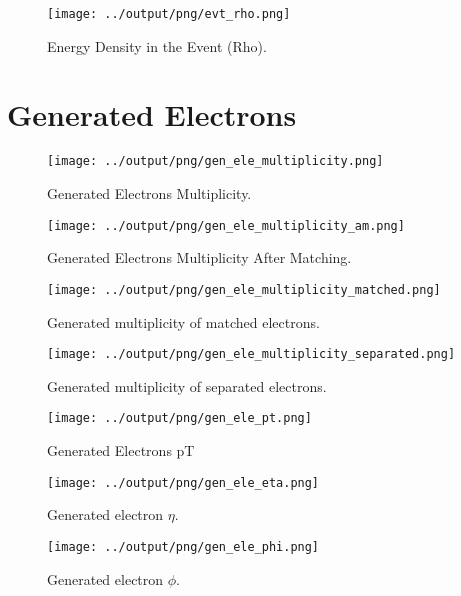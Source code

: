 \documentclass[11pt]{book}
\begin{document}
\begin{figure}[htb]
\centering
\texttt{[image: ../output/png/evt\_rho.png]}
\caption{Energy Density in the Event (Rho).}
\label{fig:rho}
\end{figure}
\clearpage


\section{Generated Electrons}

\begin{figure}[htb]
\centering
\texttt{[image: ../output/png/gen\_ele\_multiplicity.png]}
\caption{Generated Electrons Multiplicity.}
\label{fig:gen_ele_multiplicity}
\end{figure}

\begin{figure}[htb]
\centering
\texttt{[image: ../output/png/gen\_ele\_multiplicity\_am.png]}
\caption{Generated Electrons Multiplicity After Matching.}
\label{fig:gen_ele_multiplicity_am}
\end{figure}


\begin{figure}[htb]
\centering
\texttt{[image: ../output/png/gen\_ele\_multiplicity\_matched.png]}
\caption{Generated multiplicity of matched electrons.}
\label{fig:gn_ele_mat}
\end{figure}

\begin{figure}[htb]
\centering
\texttt{[image: ../output/png/gen\_ele\_multiplicity\_separated.png]}
\caption{Generated multiplicity of separated electrons.}
\label{fig:gn_ele_sep}
\end{figure}


\begin{figure}[htb]
\centering
\texttt{[image: ../output/png/gen\_ele\_pt.png]}
\caption{Generated Electrons pT}
\label{fig:gen_ele_pt}
\end{figure}

\begin{figure}[htb]
\centering
\texttt{[image: ../output/png/gen\_ele\_eta.png]}
\caption{Generated electron $\eta$.}
\label{fig:gen_ele_eta}
\end{figure}

\begin{figure}[htb]
\centering
\texttt{[image: ../output/png/gen\_ele\_phi.png]}
\caption{Generated electron $\phi$.}
\label{fig:gen_ele_phi}
\end{figure}
\clearpage
\end{document}
